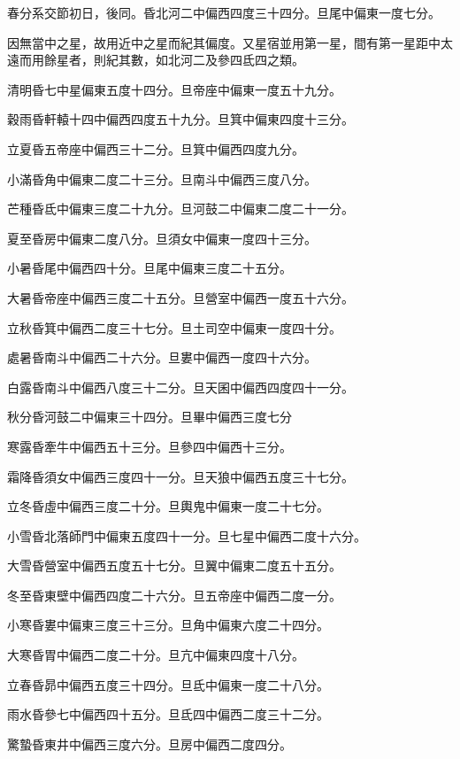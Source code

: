 \begin{pinyinscope}
春分系交節初日，後同。昏北河二中偏西四度三十四分。旦尾中偏東一度七分。

因無當中之星，故用近中之星而紀其偏度。又星宿並用第一星，間有第一星距中太遠而用餘星者，則紀其數，如北河二及參四氐四之類。

清明昏七中星偏東五度十四分。旦帝座中偏東一度五十九分。

穀雨昏軒轅十四中偏西四度五十九分。旦箕中偏東四度十三分。

立夏昏五帝座中偏西三十二分。旦箕中偏西四度九分。

小滿昏角中偏東二度二十三分。旦南斗中偏西三度八分。

芒種昏氐中偏東三度二十九分。旦河鼓二中偏東二度二十一分。

夏至昏房中偏東二度八分。旦須女中偏東一度四十三分。

小暑昏尾中偏西四十分。旦尾中偏東三度二十五分。

大暑昏帝座中偏西三度二十五分。旦營室中偏西一度五十六分。

立秋昏箕中偏西二度三十七分。旦土司空中偏東一度四十分。

處暑昏南斗中偏西二十六分。旦婁中偏西一度四十六分。

白露昏南斗中偏西八度三十二分。旦天囷中偏西四度四十一分。

秋分昏河鼓二中偏東三十四分。旦畢中偏西三度七分

寒露昏牽牛中偏西五十三分。旦參四中偏西十三分。

霜降昏須女中偏西三度四十一分。旦天狼中偏西五度三十七分。

立冬昏虛中偏西三度二十分。旦輿鬼中偏東一度二十七分。

小雪昏北落師門中偏東五度四十一分。旦七星中偏西二度十六分。

大雪昏營室中偏西五度五十七分。旦翼中偏東二度五十五分。

冬至昏東壁中偏西四度二十六分。旦五帝座中偏西二度一分。

小寒昏婁中偏東三度三十三分。旦角中偏東六度二十四分。

大寒昏胃中偏西二度二十分。旦亢中偏東四度十八分。

立春昏昴中偏西五度三十四分。旦氐中偏東一度二十八分。

雨水昏參七中偏西四十五分。旦氐四中偏西二度三十二分。

驚蟄昏東井中偏西三度六分。旦房中偏西二度四分。


\end{pinyinscope}